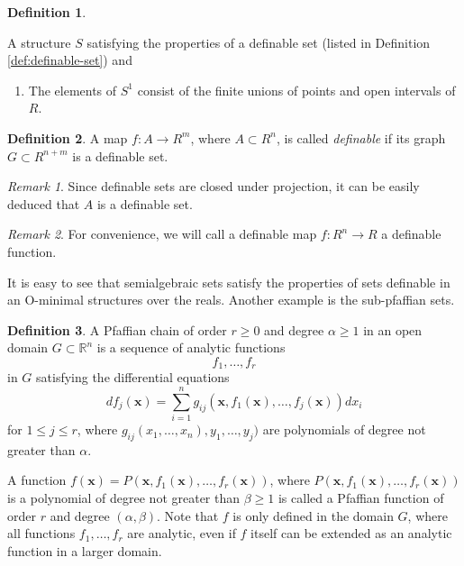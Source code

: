 \documentclass[
]{book}
\providecommand{\tightlist}{%
  \setlength{\itemsep}{0pt}\setlength{\parskip}{0pt}}
\theoremstyle{definition}
\newtheorem{definition}{Definition}[chapter]
\theoremstyle{definition}
\theoremstyle{definition}
\theoremstyle{definition}
\theoremstyle{remark}
\newtheorem*{remark}{Remark}
\begin{document}
\begin{definition}
\protect\hypertarget{def:o-minimal-structure}{}\label{def:o-minimal-structure}

A structure \(S\) satisfying the properties of a definable set (listed in Definition \ref{def:definable-set}) and

\begin{enumerate}
\def\labelenumi{\arabic{enumi}.}
\setcounter{enumi}{4}
\tightlist
\item
  The elements of \(S^1\) consist of the finite unions of points and open intervals of \(R\).
\end{enumerate}

\end{definition}

\begin{definition}
\protect\hypertarget{def:definable-function}{}\label{def:definable-function}A map \(f : A \to R^m\), where \(A \subset R^n\), is called \emph{definable} if its graph \(G \subset R^{n+m}\) is a definable set.
\end{definition}

\begin{remark}
Since definable sets are closed under projection, it can be easily deduced that \(A\) is a definable set.
\end{remark}

\begin{remark}
For convenience, we will call a definable map \(f : R^n \to R\) a definable function.
\end{remark}

It is easy to see that semialgebraic sets satisfy the properties of sets definable in an O-minimal structures over the reals. Another example is the sub-pfaffian sets.

\begin{definition}
\citep[Definition 2.1]{gv04}
A Pfaffian chain of order \(r \ge 0\) and degree \(\alpha \ge 1\) in an open domain \(G \subset \mathbb{R}^n\) is a sequence of analytic functions
\[
f_1, \ldots , f_r
\]
in \(G\) satisfying the differential equations
\[
{df}_j(\mathbf{x}) = \sum^n_{i=1} g_{ij}(\mathbf{x}, f_1(\mathbf{x}), \ldots, f_j(\mathbf{x})) dx_i
\]
for \(1 \le j \le r\), where \(g_{ij}(x_1,\ldots,x_n),y_1,\ldots,y_j)\) are polynomials of degree not greater than \(\alpha\).

A function \(f(\mathbf{x}) = P(\mathbf{x},f_1(\mathbf{x}),\ldots,f_r(\mathbf{x}))\), where \(P(\mathbf{x}, f_1(\mathbf{x}), \ldots, f_r(\mathbf{x}))\) is a polynomial of degree not greater than \(\beta \ge 1\) is called a Pfaffian function of order \(r\) and degree \((\alpha, \beta)\). Note that \(f\) is only defined in the domain \(G\), where all functions \(f_1,\ldots,f_r\) are analytic, even if \(f\) itself can be extended as an analytic function in a larger domain.
\end{definition}
\end{document}
